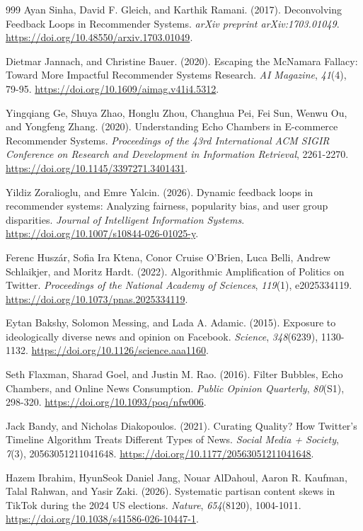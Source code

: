 \begin{thebibliography}{999}
Ayan Sinha, David F. Gleich, and Karthik Ramani. (2017). Deconvolving Feedback Loops in Recommender Systems. \textit{arXiv preprint arXiv:1703.01049}. \url{https://doi.org/10.48550/arxiv.1703.01049}.

Dietmar Jannach, and Christine Bauer. (2020). Escaping the McNamara Fallacy: Toward More Impactful Recommender Systems Research. \textit{AI Magazine}, \textit{41}(4), 79-95. \url{https://doi.org/10.1609/aimag.v41i4.5312}.

Yingqiang Ge, Shuya Zhao, Honglu Zhou, Changhua Pei, Fei Sun, Wenwu Ou, and Yongfeng Zhang. (2020). Understanding Echo Chambers in E-commerce Recommender Systems. \textit{Proceedings of the 43rd International ACM SIGIR Conference on Research and Development in Information Retrieval}, 2261-2270. \url{https://doi.org/10.1145/3397271.3401431}.

Yildiz Zoralioglu, and Emre Yalcin. (2026). Dynamic feedback loops in recommender systems: Analyzing fairness, popularity bias, and user group disparities. \textit{Journal of Intelligent Information Systems}. \url{https://doi.org/10.1007/s10844-026-01025-y}.

Ferenc Husz\'{a}r, Sofia Ira Ktena, Conor Cruise O'Brien, Luca Belli, Andrew Schlaikjer, and Moritz Hardt. (2022). Algorithmic Amplification of Politics on Twitter. \textit{Proceedings of the National Academy of Sciences}, \textit{119}(1), e2025334119. \url{https://doi.org/10.1073/pnas.2025334119}.

Eytan Bakshy, Solomon Messing, and Lada A. Adamic. (2015). Exposure to ideologically diverse news and opinion on Facebook. \textit{Science}, \textit{348}(6239), 1130-1132. \url{https://doi.org/10.1126/science.aaa1160}.

Seth Flaxman, Sharad Goel, and Justin M. Rao. (2016). Filter Bubbles, Echo Chambers, and Online News Consumption. \textit{Public Opinion Quarterly}, \textit{80}(S1), 298-320. \url{https://doi.org/10.1093/poq/nfw006}.

Jack Bandy, and Nicholas Diakopoulos. (2021). Curating Quality? How Twitter's Timeline Algorithm Treats Different Types of News. \textit{Social Media + Society}, \textit{7}(3), 20563051211041648. \url{https://doi.org/10.1177/20563051211041648}.

Hazem Ibrahim, HyunSeok Daniel Jang, Nouar AlDahoul, Aaron R. Kaufman, Talal Rahwan, and Yasir Zaki. (2026). Systematic partisan content skews in TikTok during the 2024 US elections. \textit{Nature}, \textit{654}(8120), 1004-1011. \url{https://doi.org/10.1038/s41586-026-10447-1}.


\end{thebibliography}
